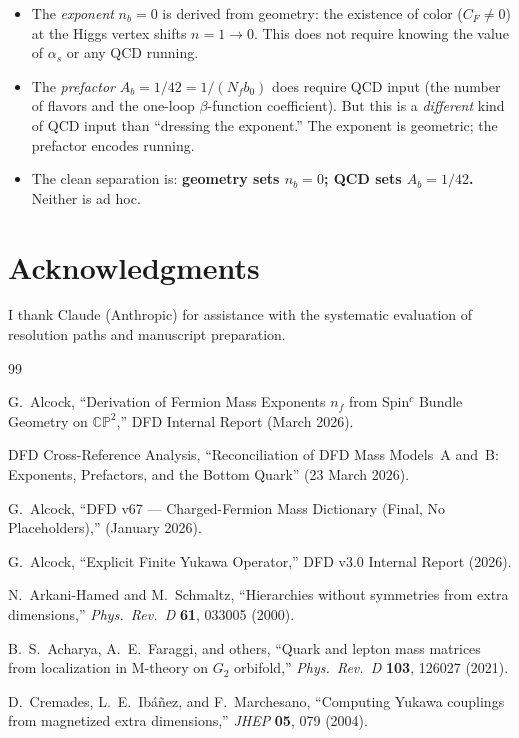 \documentclass[11pt,a4paper]{article}
\newcommand{\CP}{\mathbb{CP}}
\theoremstyle{definition}
\theoremstyle{remark}
\begin{document}
\begin{itemize}
\item The \emph{exponent} $n_b = 0$ is derived from geometry: the existence
  of color ($C_F \neq 0$) at the Higgs vertex shifts $n = 1 \to 0$.  This
  does not require knowing the value of $\alpha_s$ or any QCD running.

\item The \emph{prefactor} $A_b = 1/42 = 1/(N_f b_0)$ does require QCD
  input (the number of flavors and the one-loop $\beta$-function coefficient).
  But this is a \emph{different} kind of QCD input than ``dressing the exponent.''
  The exponent is geometric; the prefactor encodes running.

\item The clean separation is: \textbf{geometry sets $n_b = 0$; QCD sets
  $A_b = 1/42$.}  Neither is ad hoc.
\end{itemize}

\section*{Acknowledgments}

I thank Claude (Anthropic) for assistance with the systematic evaluation
of resolution paths and manuscript preparation.

\begin{thebibliography}{99}

 G.~Alcock, ``Derivation of Fermion Mass Exponents
$n_f$ from Spin$^c$ Bundle Geometry on $\CP^2$,'' DFD Internal Report
(March 2026).

 DFD Cross-Reference Analysis, ``Reconciliation of
DFD Mass Models~A and~B: Exponents, Prefactors, and the Bottom Quark''
(23 March 2026).

 G.~Alcock, ``DFD v67 --- Charged-Fermion Mass Dictionary
(Final, No Placeholders),'' (January 2026).

 G.~Alcock, ``Explicit Finite Yukawa Operator,''
DFD v3.0 Internal Report (2026).

 N.~Arkani-Hamed and M.~Schmaltz, ``Hierarchies
without symmetries from extra dimensions,'' \textit{Phys.\ Rev.\ D}
\textbf{61}, 033005 (2000).

 B.~S.~Acharya, A.~E.~Faraggi, and others,
``Quark and lepton mass matrices from localization in M-theory on
$G_2$ orbifold,'' \textit{Phys.\ Rev.\ D} \textbf{103}, 126027 (2021).

 D.~Cremades, L.~E.~Ib\'a\~nez, and F.~Marchesano,
``Computing Yukawa couplings from magnetized extra dimensions,''
\textit{JHEP} \textbf{05}, 079 (2004).

\end{thebibliography}
\end{document}
